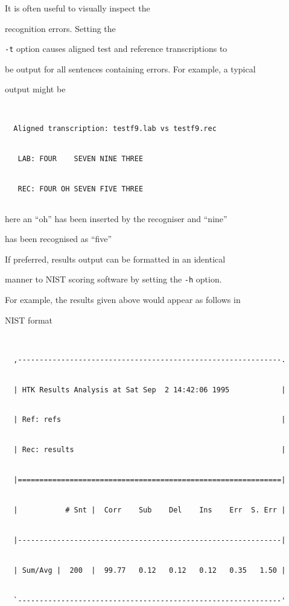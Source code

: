 It is often useful to visually inspect the 


recognition errors.  Setting the


\texttt{-t} option causes aligned test and reference transcriptions to


be output for all sentences containing errors.  For example, a typical


output might be


\begin{verbatim}


  Aligned transcription: testf9.lab vs testf9.rec


   LAB: FOUR    SEVEN NINE THREE


   REC: FOUR OH SEVEN FIVE THREE


\end{verbatim}


here an ``oh'' has been inserted by the recogniser and ``nine''


has been recognised as ``five''





If preferred, results output can be formatted in an identical


manner to NIST scoring software by setting the  {\tt -h} option.


For example, the results given above would appear as follows in


NIST format


\begin{verbatim}


  ,-------------------------------------------------------------.


  | HTK Results Analysis at Sat Sep  2 14:42:06 1995            |


  | Ref: refs                                                   |


  | Rec: results                                                |


  |=============================================================|


  |           # Snt |  Corr    Sub    Del    Ins    Err  S. Err |


  |-------------------------------------------------------------|


  | Sum/Avg |  200  |  99.77   0.12   0.12   0.12   0.35   1.50 |


  `-------------------------------------------------------------'


\end{verbatim}





